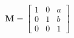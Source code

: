 \[
\mathbf{M} = \left[
\begin{array}{cc|c}
  1 & 0 & a \\
  0 & 1 & b \\
  \hline
  0 & 0 & 1
\end{array}
\right]
\]
